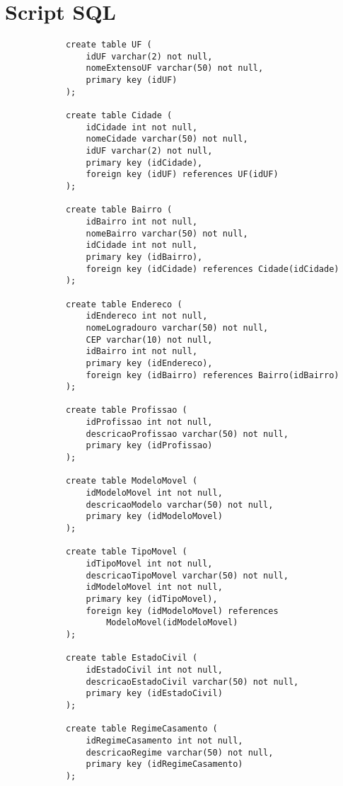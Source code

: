 \documentclass{article}
\begin{document}
    \section{Script SQL}
        \begin{lstlisting}
            create table UF (
            	idUF varchar(2) not null,
            	nomeExtensoUF varchar(50) not null,
            	primary key (idUF)
            );
            
            create table Cidade (
            	idCidade int not null,
            	nomeCidade varchar(50) not null,
            	idUF varchar(2) not null,
            	primary key (idCidade),
            	foreign key (idUF) references UF(idUF)
            );
            
            create table Bairro (
            	idBairro int not null,
            	nomeBairro varchar(50) not null,
            	idCidade int not null,
            	primary key (idBairro),
            	foreign key (idCidade) references Cidade(idCidade)
            );
            
            create table Endereco (
            	idEndereco int not null,
            	nomeLogradouro varchar(50) not null,
            	CEP varchar(10) not null,
            	idBairro int not null,
            	primary key (idEndereco),
            	foreign key (idBairro) references Bairro(idBairro)
            );
            
            create table Profissao (
            	idProfissao int not null,
            	descricaoProfissao varchar(50) not null,
            	primary key (idProfissao)
            );
            
            create table ModeloMovel (
            	idModeloMovel int not null,
            	descricaoModelo varchar(50) not null,
            	primary key (idModeloMovel)
            );
            
            create table TipoMovel (
            	idTipoMovel int not null,
            	descricaoTipoMovel varchar(50) not null,
            	idModeloMovel int not null,
            	primary key (idTipoMovel),
            	foreign key (idModeloMovel) references 
            	    ModeloMovel(idModeloMovel)
            );
            
            create table EstadoCivil (
            	idEstadoCivil int not null,
            	descricaoEstadoCivil varchar(50) not null,
            	primary key (idEstadoCivil)
            );
            
            create table RegimeCasamento (
            	idRegimeCasamento int not null,
            	descricaoRegime varchar(50) not null,
            	primary key (idRegimeCasamento)
            );
            

\end{lstlisting}
\end{document}
